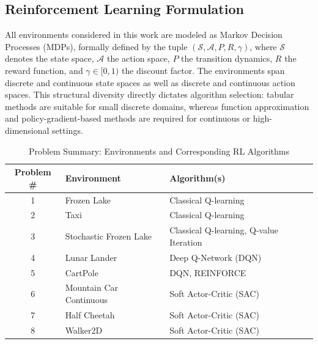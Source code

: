 \documentclass[10pt]{article}
\begin{document}
\subsection*{Reinforcement Learning Formulation}
All environments considered in this work are modeled as Markov Decision Processes (MDPs), formally defined by the tuple $(\mathcal{S}, \mathcal{A}, P, R, \gamma)$, where $\mathcal{S}$ denotes the state space, $\mathcal{A}$ the action space, $P$ the transition dynamics, $R$ the reward function, and $\gamma \in [0,1)$ the discount factor. The environments span discrete and continuous state spaces as well as discrete and continuous action spaces. This structural diversity directly dictates algorithm selection: tabular methods are suitable for small discrete domains, whereas function approximation and policy-gradient-based methods are required for continuous or high-dimensional settings.

\vspace{1em}
\begin{table}[h]
\centering
\small
\setlength{\tabcolsep}{4pt}
\begin{tabularx}{\linewidth}{cYY}
\hline
\bfseries Problem \# & \bfseries Environment & \bfseries Algorithm(s) \\
 & Frozen Lake & Classical Q-learning \\
2 & Taxi & Classical Q-learning \\
3 & Stochastic Frozen Lake & Classical Q-learning, Q-value Iteration \\
4 & Lunar Lander & Deep Q-Network (DQN) \\
5 & CartPole & DQN, REINFORCE \\
6 & Mountain Car Continuous & Soft Actor-Critic (SAC) \\
7 & Half Cheetah & Soft Actor-Critic (SAC) \\
8 & Walker2D & Soft Actor-Critic (SAC) \\
\hline
\end{tabularx}
\caption{Problem Summary: Environments and Corresponding RL Algorithms}
\end{table}
\vspace{1em}
\end{document}
